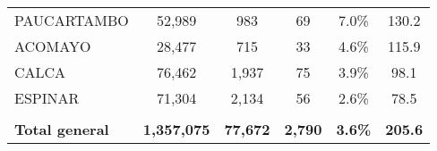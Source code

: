 \begin{tabular}{lccccc}
	\cellcolor[HTML]{FFE699}PAUCARTAMBO                             & 52,989               & 983                        & 69                   & 7.0\%                      & 130.2                                       \\
	\cellcolor[HTML]{FFE699}ACOMAYO                                 & 28,477               & 715                        & 33                   & 4.6\%                      & 115.9                                       \\
	\cellcolor[HTML]{FFE699}CALCA                                   & 76,462               & 1,937                      & 75                   & 3.9\%                      & 98.1                                        \\
	\cellcolor[HTML]{FFE699}ESPINAR                                 & 71,304               & 2,134                      & 56                   & 2.6\%                      & 78.5                                        \\
	& \multicolumn{1}{l}{} & \multicolumn{1}{l}{}       & \multicolumn{1}{l}{} & \multicolumn{1}{l}{}       & \multicolumn{1}{l}{}                        \\
	\rowcolor[HTML]{DDEBF7} 
	\textbf{Total general}                                          & \textbf{1,357,075}   & \textbf{77,672}            & \textbf{2,790}       & \textbf{3.6\%}             & \textbf{205.6}                             
\end{tabular}